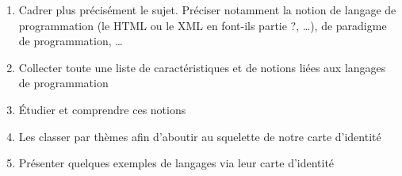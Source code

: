 \documentclass[a4paper, 11pt]{article}
\begin{document}
\begin{enumerate}
\item Cadrer plus précisément le sujet. Préciser notamment la notion de langage de programmation (le HTML ou le XML en font-ils partie ?, …), de paradigme de programmation, …
\item Collecter toute une liste de caractéristiques et de notions liées aux langages de programmation
\item Étudier et comprendre ces notions
\item Les classer par thèmes afin d'aboutir au squelette de notre carte d'identité
\item Présenter quelques exemples de langages via leur carte d'identité
\end{enumerate}
\end{document}
